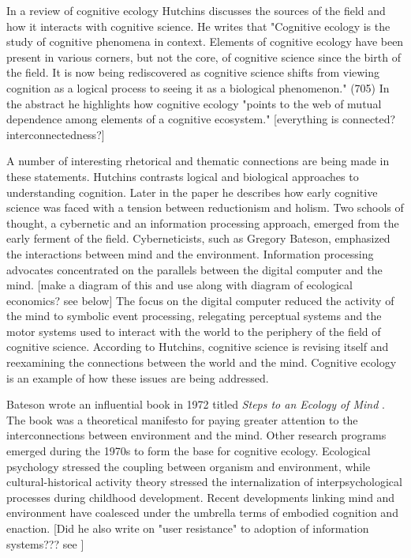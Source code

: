 In a review of cognitive ecology Hutchins \citep{hutchins_cognitive_2010} discusses the sources of the field and how it interacts with cognitive science. He writes that "Cognitive ecology is the study of cognitive phenomena in context. Elements of cognitive ecology have been present in various corners, but not the core, of cognitive science since the birth of the field. It is now being rediscovered as cognitive science shifts from viewing cognition as a logical process to seeing it as a biological phenomenon." (705) In the abstract he highlights how cognitive ecology "points to the web of mutual dependence among elements of a cognitive ecosystem." [everything is connected? interconnectedness?]

A number of interesting rhetorical and thematic connections are being made in these statements. Hutchins contrasts logical and biological approaches to understanding cognition. Later in the paper he describes how early cognitive science was faced with a tension between reductionism and holism. Two schools of thought, a cybernetic and an information processing approach, emerged from the early ferment of the field. Cyberneticists, such as Gregory Bateson, emphasized the interactions between mind and the environment. Information processing advocates concentrated on the parallels between the digital computer and the mind. [make a diagram of this and use along with diagram of ecological economics? see below] The focus on the digital computer reduced the activity of the mind to symbolic event processing, relegating perceptual systems and the motor systems used to interact with the world to the periphery of the field of cognitive science. According to Hutchins, cognitive science is revising itself and reexamining the connections between the world and the mind. Cognitive ecology is an example of how these issues are being addressed.

Bateson wrote an influential book in 1972 titled \textit{Steps to an Ecology of Mind} \citep{bateson_1972}. The book was a theoretical manifesto for paying greater attention to the interconnections between environment and the mind. Other research programs emerged during the 1970s to form the base for cognitive ecology. Ecological psychology stressed the coupling between organism and environment, while cultural-historical activity theory stressed the internalization of interpsychological processes during childhood development. Recent developments linking mind and environment have coalesced under the umbrella terms of embodied cognition and enaction. [Did he also write on "user resistance" to adoption of information systems??? see \citep{star_1996}]

